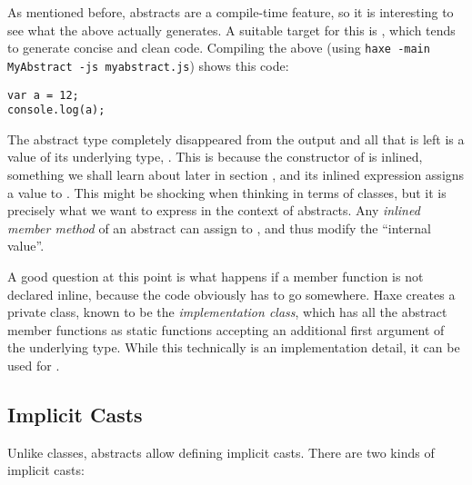 \documentclass{haxe}
\begin{document}
As mentioned before, abstracts are a compile-time feature, so it is interesting to see what the above actually generates. A suitable target for this is , which tends to generate concise and clean code. Compiling the above (using \texttt{haxe -main MyAbstract -js myabstract.js}) shows this  code:

\begin{lstlisting}
var a = 12;
console.log(a);
\end{lstlisting}
The abstract type  completely disappeared from the output and all that is left is a value of its underlying type, . This is because the constructor of  is inlined, something we shall learn about later in section , and its inlined expression assigns a value to . This might be shocking when thinking in terms of classes, but it is precisely what we want to express in the context of abstracts. Any \emph{inlined member method} of an abstract can assign to , and thus modify the ``internal value''.

A good question at this point is what happens if a member function is not declared inline, because the code obviously has to go somewhere. Haxe creates a private class, known to be the \emph{implementation class}, which has all the abstract member functions as static functions accepting an additional first argument  of the underlying type. While this technically is an implementation detail, it can be used for .







\subsection{Implicit Casts}
\label{types-abstract-implicit-casts}

Unlike classes, abstracts allow defining implicit casts. There are two kinds of implicit casts:
\end{document}
